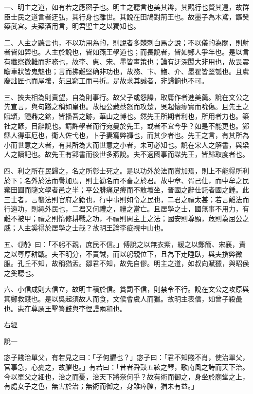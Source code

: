 
\begin{pinyinscope}
一、明主之道，如有若之應密子也。明主之聽言也美其辯，其觀行也賢其遠，故群臣士民之道言者迂弘，其行身也離世。其說在田鳩對荊王也。故墨子為木鳶，謳癸築武宮。夫藥酒用言，明君聖主之以獨知也。

二、人主之聽言也，不以功用為的，則說者多棘刺白馬之說；不以儀的為關，則射者皆如羿也。人主於說也，皆如燕王學道也；而長說者，皆如鄭人爭年也。是以言有纖察微難而非務也，故李、惠、宋、墨皆畫策也；論有迂深閎大非用也，故畏震瞻車狀皆鬼魅也；言而拂難堅确非功也，故務、卞、鮑、介、墨翟皆堅瓠也。且虞慶詘匠也而屋壤，范且窮工而弓折。是故求其誠者，非歸餉也不可。

三、挾夫相為則責望，自為則事行。故父子或怨譟，取庸作者進美羹。說在文公之先宣言，與句踐之稱如皇也。故桓公藏蔡怒而攻楚，吳起懷瘳實而吮傷。且先王之賦頌，鍾鼎之銘，皆播吾之跡，華山之博也。然先王所期者利也，所用者力也。築社之諺，目辭說也。請許學者而行宛曼於先王，或者不宜今乎？如是不能更也。鄭縣人得車厄也，衛人佐弋也，卜子妻寫弊褲也，而其少者也。先王之言，有其所為小而世意之大者，有其所為大而世意之小者，未可必知也。說在宋人之解書，與梁人之讀記也。故先王有郢書而後世多燕說。夫不適國事而謀先王，皆歸取度者也。

四、利之所在民歸之，名之所彰士死之。是以功外於法而賞加焉，則上不能得所利於下；名外於法而譽加焉，則士勸名而不畜之於君。故中章、胥己仕，而中牟之民棄田圃而隨文學者邑之半；平公腓痛足痺而不敢壞坐，晉國之辭仕託者國之錘。此三士者，言襲法則官府之籍也，行中事則如令之民也，二君之禮太甚；若言離法而行遠功，則繩外民也，二君又何禮之，禮之當亡。且居學之士，國無事不用力，有難不被甲；禮之則惰修耕戰之功，不禮則周主上之法；國安則尊顯，危則為屈公之威；人主奚得於居學之士哉？故明王論李疵視中山也。

五、《詩》曰：「不躬不親，庶民不信。」傅說之以無衣紫，緩之以鄭簡、宋襄，責之以尊厚耕戰。夫不明分，不責誠，而以躬親位下，且為下走睡臥，與夫揜弊微服。孔丘不知，故稱猶盂。鄒君不知，故先自僇。明主之道，如叔向賦獵，與昭侯之奚聽也。

六、小信成則大信立，故明主積於信。賞罰不信，則禁令不行。說在文公之攻原與箕鄭救餓也。是以吳起須故人而食，文侯會虞人而獵。故明主表信，如曾子殺彘也。患在尊厲王擊警鼓與李悝謾兩和也。

右經

說一

宓子賤治單父，有若見之曰：「子何臞也？」宓子曰：「君不知賤不肖，使治單父，官事急，心憂之，故臞也。」有若曰：「昔者舜鼓五絃之琴，歌南風之詩而天下治。今以單父之細也，治之而憂，治天下將奈何乎？故有術而御之，身坐於廟堂之上，有處女子之色，無害於治；無術而御之，身雖瘁臞，猶未有益。」


\end{pinyinscope}
